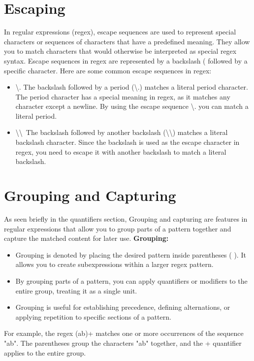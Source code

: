\documentclass{report}
\begin{document}
    \pagebreak
    \bigbreak
    \noindent


    \section{Escaping}
    \bigbreak \noindent 
    In regular expressions (regex), escape sequences are used to represent special characters or sequences of characters that have a predefined meaning. They allow you to match characters that would otherwise be interpreted as special regex syntax. Escape sequences in regex are represented by a backslash (\) followed by a specific character. 
    \bigbreak \noindent 
    Here are some common escape sequences in regex:
    \begin{itemize}
        \item \textbackslash . The backslash followed by a period (\textbackslash .) matches a literal period character. The period character has a special meaning in regex, as it matches any character except a newline. By using the escape sequence \textbackslash . you can match a literal period.
        \item \textbackslash \textbackslash \  The backslash followed by another backslash (\textbackslash \textbackslash) matches a literal backslash character. Since the backslash is used as the escape character in regex, you need to escape it with another backslash to match a literal backslash.
    \end{itemize}
    \pagebreak
    \bigbreak
    \noindent

    \section{Grouping and Capturing}
    \bigbreak \noindent 
    As seen briefly in the quantifiers section, Grouping and capturing are features in regular expressions that allow you to group parts of a pattern together and capture the matched content for later use.
    \bigbreak \noindent 
    \textbf{Grouping:}
    \begin{itemize}
        \item Grouping is denoted by placing the desired pattern inside parentheses ( ). It allows you to create subexpressions within a larger regex pattern.
        \item By grouping parts of a pattern, you can apply quantifiers or modifiers to the entire group, treating it as a single unit.
        \item Grouping is useful for establishing precedence, defining alternations, or applying repetition to specific sections of a pattern.
    \end{itemize}
    \bigbreak \noindent 
    For example, the regex (ab)+ matches one or more occurrences of the sequence "ab". The parentheses group the characters "ab" together, and the + quantifier applies to the entire group.
\end{document}

